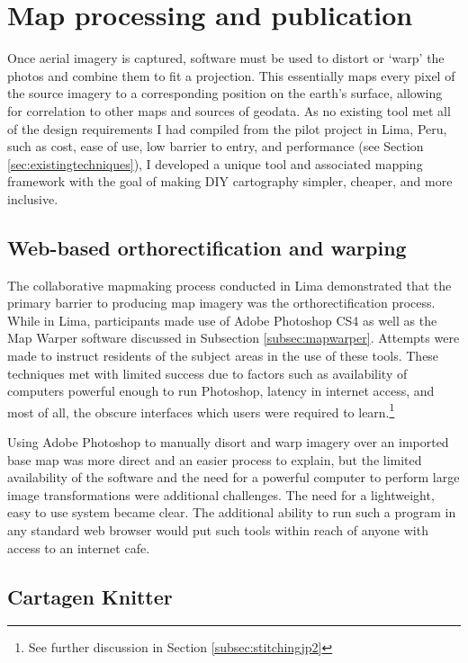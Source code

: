 \documentclass[11pt,oneside,notitlepage]{report}
\begin{document}
\section{Map processing and publication}

Once aerial imagery is captured, software must be used to distort or `warp' the photos and combine them to fit a projection. This essentially maps every pixel of the source imagery to a corresponding position on the earth's surface, allowing for correlation to other maps and sources of geodata. As no existing tool met all of the design requirements I had compiled from the pilot project in Lima, Peru, such as cost, ease of use, low barrier to entry, and performance (see Section \ref{sec:existingtechniques}), I developed a unique tool and associated mapping framework with the goal of making DIY cartography simpler, cheaper, and more inclusive.

\subsection{Web-based orthorectification and warping}

The collaborative mapmaking process conducted in Lima demonstrated that the primary barrier to producing map imagery was the orthorectification process. While in Lima, participants made use of Adobe Photoshop CS4 as well as the Map Warper software discussed in Subsection \ref{subsec:mapwarper}. Attempts were made to instruct residents of the subject areas in the use of these tools. These techniques met with limited success due to factors such as availability of computers powerful enough to run Photoshop, latency in internet access, and most of all, the obscure interfaces which users were required to learn.\footnote{See further discussion in Section \ref{subsec:stitchingjp2}} 

Using Adobe Photoshop to manually disort and warp imagery over an imported base map was more direct and an easier process to explain, but the limited availability of the software and the need for a powerful computer to perform large image transformations were additional challenges. The need for a lightweight, easy to use system became clear. The additional ability to run such a program in any standard web browser would put such tools within reach of anyone with access to an internet cafe.

\subsection{Cartagen Knitter}
\label{subsubsec:knitter}
\end{document}
